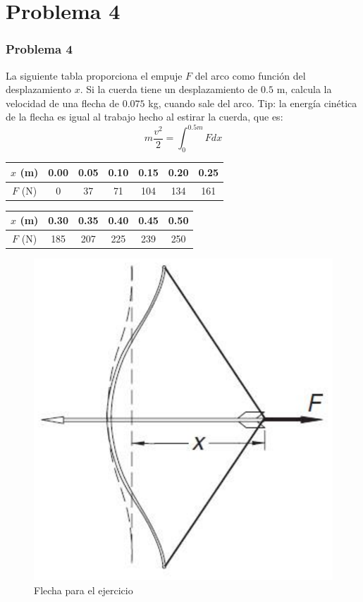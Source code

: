 \documentclass[12pt]{beamer}
\begin{document}
\section{Problema 4}
\begin{frame}
\frametitle{Problema 4}
La siguiente tabla proporciona el empuje $F$ del arco como funci\'{o}n del desplazamiento $x$. Si la cuerda tiene un desplazamiento de $0.5$ m, calcula la velocidad de una flecha de $0.075$ kg, cuando sale del arco. Tip: la energ\'{i}a cin\'{e}tica de la flecha es igual al trabajo hecho al estirar la cuerda, que es:
\[ m \dfrac{v^{2}}{2} = \int_{0}^{0.5m} F dx\]
\begin{center}
\begin{tabular}{c | c | c | c | c | c | c |}
$x$ (m) & 0.00 & 0.05 & 0.10 & 0.15 & 0.20 & 0.25  \\ \hline
$F$ (N)  & 0 & 37 & 71 & 104 & 134 & 161
\end{tabular}
\end{center}
\begin{center}
\begin{tabular}{c | c | c | c | c | c | }
$x$ (m) & 0.30 & 0.35 & 0.40 & 0.45 & 0.50 \\ \hline
$F$ (N)  & 185 & 207 & 225 & 239 & 250 
\end{tabular}
\end{center}
\end{frame}
\begin{frame}
\begin{center}
\begin{figure}[H]
	\centering
	\includegraphics[scale=0.5]{Integral_01_Arco.eps} 
	\caption{Flecha para el ejercicio}
\end{figure}
\end{center}
\end{frame}
\end{document}
